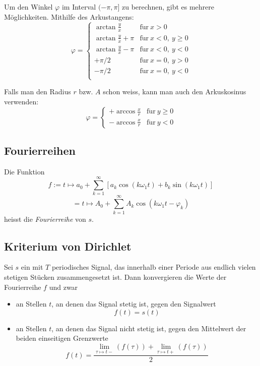 \documentclass[10pt,a4paper]{scrartcl}
\begin{document}
Um den Winkel $\varphi$ im Interval $(-\pi, \pi]$ zu berechnen, gibt es mehrere
Möglichkeiten. Mithilfe des Arkustangens:
$$\varphi = \begin{cases}
    \arctan\frac{y}{x} & \mathrm{f\ddot ur}\ x > 0\\
    \arctan\frac{y}{x} + \pi & \mathrm{f\ddot ur}\ x < 0,\ y \geq 0\\
    \arctan\frac{y}{x} - \pi & \mathrm{f\ddot ur}\ x < 0,\ y < 0\\
    +\pi/2 & \mathrm{f\ddot ur}\ x = 0,\ y > 0\\
    -\pi/2 & \mathrm{f\ddot ur}\ x = 0,\ y < 0\\
\end{cases}$$

Falls man den Radius $r$ bzw. $A$ schon weiss, kann man auch den Arkuskosinus
verwenden:
$$\varphi = \begin{cases}
    +\arccos\frac{x}{r} & \mathrm{f\ddot ur}\ y\geq 0\\
    -\arccos\frac{x}{r} & \mathrm{f\ddot ur}\ y<0
\end{cases}$$


\subsection{Fourierreihen}

Die Funktion
$$f := t \mapsto a_0 + \sum_{k=1}^{\infty} \left[a_k \cos(k\omega_1t) + b_k
    \sin(k\omega_1t)\right]$$
$$= t \mapsto A_0 + \sum_{k=1}^{\infty} A_k \cos(k\omega_1 t - \varphi_k)$$
heisst die \emph{Fourierreihe} von $s$.


\subsection{Kriterium von Dirichlet}

Sei $s$ ein mit $T$ periodisches Signal, das innerhalb einer Periode aus
endlich vielen stetigen Stücken zusammengesetzt ist. Dann konvergieren die
Werte der Fourierreihe $f$ und zwar
\begin{itemize}
    \item an Stellen $t$, an denen das Signal stetig ist, gegen den Signalwert
    $$f(t) = s(t)$$
    \item an Stellen $t$, an denen das Signal nicht stetig ist, gegen den
    Mittelwert der beiden einseitigen Grenzwerte
    $$f(t) = \frac{\lim\limits_{\tau \mapsto t-}(f(\tau)) + \lim\limits_{\tau
        \mapsto t+}(f(\tau))}{2}$$
\end{itemize}
\end{document}
